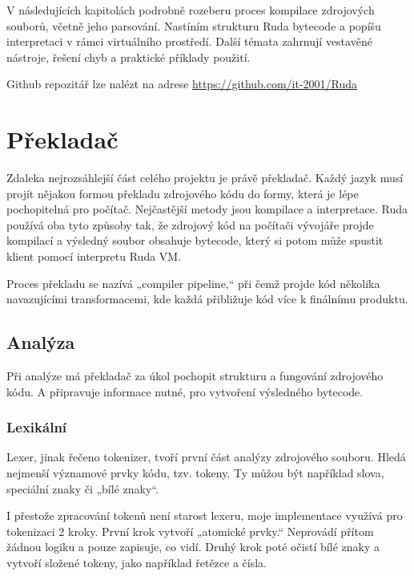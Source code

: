\documentclass[12pt, a4paper,
twoside,        %
openright
]{report}
\let\oldchapter\chapter
\renewcommand{\chapter}{
	\clearpage
	\pagestyle{fancy}
	\oldchapter
}
\begin{document}
\noindent 
V následujících kapitolách podrobně rozeberu proces kompilace zdrojových souborů, včetně jeho parsování. Nastíním strukturu Ruda bytecode a popíšu interpretaci v rámci virtuálního prostředí. Další témata zahrnují vestavěné nástroje, řešení chyb a praktické příklady použití.

Github repozitář lze nalézt na adrese \url{https://github.com/it-2001/Ruda}



\chapter{Překladač}

Zdaleka nejrozsáhlejší část celého projektu je právě překladač. Každý jazyk musí projít nějakou formou překladu zdrojového kódu do formy, která je lépe pochopitelná pro počítač. Nejčastější metody jsou kompilace a interpretace. Ruda používá oba tyto způsoby tak, že zdrojový kód na počítači vývojáře projde kompilací a výsledný soubor obsahuje bytecode, který si potom může spustit klient pomocí interpretu Ruda VM.

Proces překladu se nazívá „compiler pipeline,“ při čemž projde kód několika navazujícími transformacemi, kde každá přibližuje kód více k finálnímu produktu.

\section{Analýza}

Při analýze má překladač za úkol pochopit strukturu a fungování zdrojového kódu. A připravuje informace nutné, pro vytvoření výsledného bytecode.

\subsection{Lexikální}

Lexer, jinak řečeno tokenizer, tvoří první část analýzy zdrojového souboru. Hledá nejmenší významové prvky kódu, tzv. tokeny. Ty můžou být například slova, speciální znaky či „bílé znaky“.

I přestože zpracování tokenů není starost lexeru, moje implementace využívá pro tokenizaci 2 kroky. První krok vytvoří „atomické prvky.“ Neprovádí přítom žádnou logiku a pouze zapisuje, co vidí. Druhý krok poté očistí bílé znaky a vytvoří složené tokeny, jako například řetězce a čísla.
\end{document}
